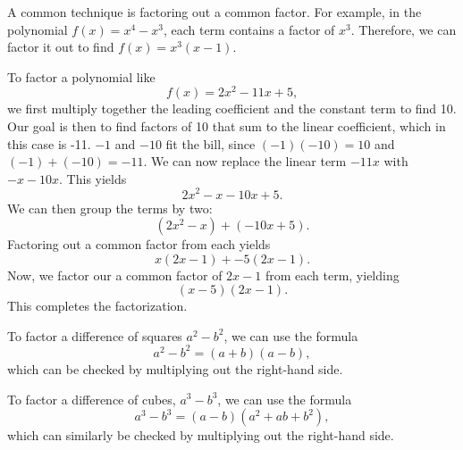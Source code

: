\documentclass{ximera}
\begin{document}
A common technique is factoring out a common factor. For example, in the polynomial $f(x) = x^4 - x^3$, each term contains a factor of $x^3$. Therefore, we can factor it out to find $f(x) = x^3(x - 1)$. 

To factor a polynomial like $$f(x) = 2x^2 - 11x + 5,$$ we first multiply together the leading coefficient and the constant term to find 10. Our goal is then to find factors of 10 that sum to the linear coefficient, which in this case is -11. $-1$ and $-10$ fit the bill, since $(-1)(-10) = 10$ and $(-1) + (-10) = -11$. We can now replace the linear term $-11x$ with $-x - 10x$. This yields $$2x^2 - x - 10x + 5.$$ We can then group the terms by two: $$(2x^2 - x) + (-10x + 5).$$ Factoring out a common factor from each yields $$x(2x - 1) + -5(2x - 1).$$ Now, we factor our a common factor of $2x - 1$ from each term, yielding $$(x - 5)(2x - 1).$$ This completes the factorization.

To factor a difference of squares $a^2 - b^2$, we can use the formula $$a^2 - b^2 = (a + b)(a - b),$$ which can be checked by multiplying out the right-hand side.

To factor a difference of cubes, $a^3 - b^3$, we can use the formula $$a^3 - b^3 = (a - b)(a^2 + ab + b^2),$$ which can similarly be checked by multiplying out the right-hand side. 
\end{document}
